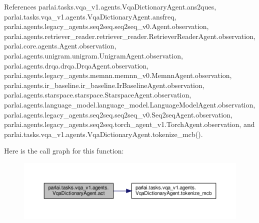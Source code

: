 References parlai.\+tasks.\+vqa\+\_\+v1.\+agents.\+Vqa\+Dictionary\+Agent.\+ans2ques, parlai.\+tasks.\+vqa\+\_\+v1.\+agents.\+Vqa\+Dictionary\+Agent.\+ansfreq, parlai.\+agents.\+legacy\+\_\+agents.\+seq2seq.\+seq2seq\+\_\+v0.\+Agent.\+observation, parlai.\+agents.\+retriever\+\_\+reader.\+retriever\+\_\+reader.\+Retriever\+Reader\+Agent.\+observation, parlai.\+core.\+agents.\+Agent.\+observation, parlai.\+agents.\+unigram.\+unigram.\+Unigram\+Agent.\+observation, parlai.\+agents.\+drqa.\+drqa.\+Drqa\+Agent.\+observation, parlai.\+agents.\+legacy\+\_\+agents.\+memnn.\+memnn\+\_\+v0.\+Memnn\+Agent.\+observation, parlai.\+agents.\+ir\+\_\+baseline.\+ir\+\_\+baseline.\+Ir\+Baseline\+Agent.\+observation, parlai.\+agents.\+starspace.\+starspace.\+Starspace\+Agent.\+observation, parlai.\+agents.\+language\+\_\+model.\+language\+\_\+model.\+Language\+Model\+Agent.\+observation, parlai.\+agents.\+legacy\+\_\+agents.\+seq2seq.\+seq2seq\+\_\+v0.\+Seq2seq\+Agent.\+observation, parlai.\+agents.\+legacy\+\_\+agents.\+seq2seq.\+torch\+\_\+agent\+\_\+v1.\+Torch\+Agent.\+observation, and parlai.\+tasks.\+vqa\+\_\+v1.\+agents.\+Vqa\+Dictionary\+Agent.\+tokenize\+\_\+mcb().

Here is the call graph for this function\+:
\nopagebreak
\begin{figure}[H]
\begin{center}
\leavevmode
\includegraphics[width=350pt]{classparlai_1_1tasks_1_1vqa__v1_1_1agents_1_1VqaDictionaryAgent_af491fa3e37b0ff66ce8feb0c6ea7da16_cgraph}
\end{center}
\end{figure}
\mbox{\label{classparlai_1_1tasks_1_1vqa__v1_1_1agents_1_1VqaDictionaryAgent_a77cb7a0b3e0fbbec04905a9745f95dd7}} 

